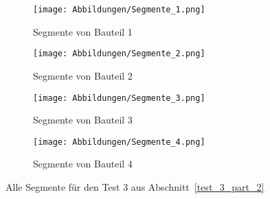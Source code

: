 \begin{figure}[h]
	\centering
	\begin{subfigure}{0.49\textwidth}
		\texttt{[image: Abbildungen/Segmente\_1.png]}
		\centering
		\caption{Segmente von Bauteil 1}
		\label{fig:Segmente_1}
	\end{subfigure}
	\hfill
	\begin{subfigure}{0.49\textwidth}
		\texttt{[image: Abbildungen/Segmente\_2.png]}
		\centering
		\caption{Segmente von Bauteil 2}
		\label{fig:Segmente_2}
	\end{subfigure}
	\vfill
	\begin{subfigure}{0.49\textwidth}
		\texttt{[image: Abbildungen/Segmente\_3.png]}
		\centering
		\caption{Segmente von Bauteil 3}
		\label{fig:Segmente_3}
	\end{subfigure}
	\hfill
	\begin{subfigure}{0.49\textwidth}
		\texttt{[image: Abbildungen/Segmente\_4.png]}
		\centering
		\caption{Segmente von Bauteil 4}
		\label{fig:Segmente_4}
	\end{subfigure}
	\caption{Alle Segmente für den Test 3 aus Abschnitt~\ref{test_3_part_2}}
	\label{fig:Segmente_test_3_2}
\end{figure}

